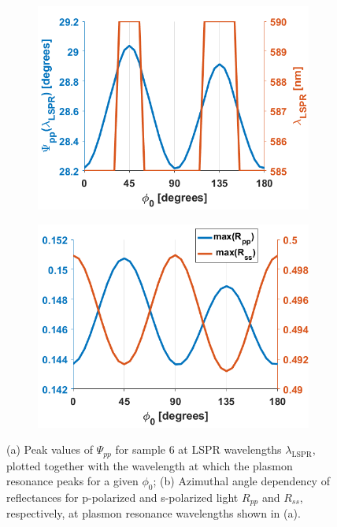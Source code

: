 \begin{figure}[h!]
    \begin{subfigure}{0.5\textwidth}
        \centering
        \includegraphics[width=0.8\linewidth, trim=0cm  0cm 0cm 0cm, clip]{figures/ch4/S6/S6_Psi_pp@LSPR.png}
        \caption{}
        \label{fig:S6_LSPRvsphi_Psipp}
    \end{subfigure}
    \begin{subfigure}{0.5\textwidth}
        \centering
        \includegraphics[width=0.8\linewidth, trim=0cm  0cm 0cm 0cm, clip]{figures/ch4/S6/S6_Rpp_Rss@LSPR.png}
        \caption{}
        \label{fig:S6_LSPRvsphi_RppRss}
    \end{subfigure}
    \caption{(a) Peak values of $\Psi_{pp}$ for sample 6 at LSPR wavelengths $\lambda_{\text{LSPR}}$, plotted together with the wavelength at which the plasmon resonance peaks for a given $\phi_0$; (b) Azimuthal angle dependency of reflectances for p-polarized and s-polarized light $R_{pp}$ and $R_{ss}$, respectively, at plasmon resonance wavelengths shown in (a).}
    \label{fig:S6_LSPRvsphi}
\end{figure}
